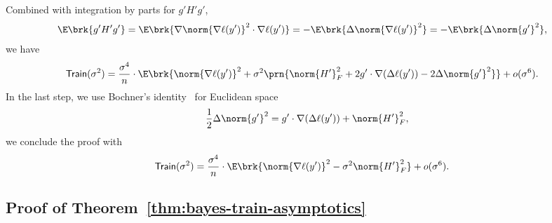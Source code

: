\documentclass[11pt]{article}
\newcommand{\trerr}{\mathsf{Train}}
\begin{document}
Combined with integration by parts for $g'H'g'$,
\begin{align*}
    \E \brk{g'H'g'} & = \E \brk{\nabla \norm{\nabla \ell(y')}^2 \cdot \nabla \ell(y')} = -\E \brk{\Delta \norm{\nabla \ell(y')}^2} = - \E \brk{\Delta \norm{g'}^2},
\end{align*}
we have
\begin{align*}
    &\trerr(\sigma^2)  = \frac{\sigma^4}{n} \cdot  \E \brk{ \norm{ \nabla \ell (y') }^2 + \sigma^2 \prn{\norm{H'}_F^2 + 2g' \cdot \nabla(\Delta \ell(y')) - 2 \Delta \norm{g'}^2}}  + o(\sigma^6).
\end{align*}
In the last step, we use Bochner's identity~\cite[Prop.~9.2.2]{petersen2006riemannian} for Euclidean space
\begin{align*}
    \frac{1}{2} \Delta \norm{g'}^2 = g' \cdot \nabla(\Delta \ell(y')) + \norm{H'}_F^2,
\end{align*}
we conclude the proof with
\begin{align*}
    &\trerr(\sigma^2) = \frac{\sigma^4}{n} \cdot  \E \brk{ \norm{ \nabla \ell (y') }^2 - \sigma^2 \norm{H'}_F^2}  + o(\sigma^6).
\end{align*}

\subsection{Proof of Theorem~\ref{thm:bayes-train-asymptotics}} \label{proof:bayes-train-asymptotics}
\end{document}
